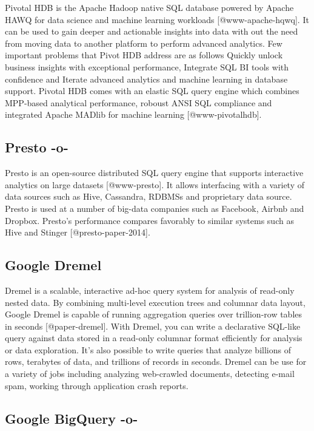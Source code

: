 Pivotal HDB is the Apache Hadoop native SQL database powered by Apache
HAWQ for data science and machine learning workloads
[@www-apache-hqwq]. It can be used to gain deeper and actionable
insights into data with out the need from moving data to another
platform to perform advanced analytics. Few important problems that
Pivot HDB address are as follows Quickly unlock business insights with
exceptional performance, Integrate SQL BI tools with confidence and
Iterate advanced analytics and machine learning in database
support. Pivotal HDB comes with an elastic SQL query engine which
combines MPP-based analytical performance, roboust ANSI SQL compliance
and integrated Apache MADlib for machine learning
[@www-pivotalhdb].


     
\subsection{Presto -o-}

Presto is an open-source distributed SQL query engine that supports
interactive analytics on large datasets [@www-presto]. It allows
interfacing with a variety of data sources such as Hive, Cassandra,
RDBMSs and proprietary data source. Presto is used at a number of
big-data companies such as Facebook, Airbnb and Dropbox. Presto's
performance compares favorably to similar systems such as Hive and
Stinger [@presto-paper-2014].



\subsection{Google Dremel}
 
Dremel is a scalable, interactive ad-hoc query system for analysis of
read-only nested data. By combining multi-level execution trees and
columnar data layout, Google Dremel is capable of running aggregation
queries over trillion-row tables in seconds [@paper-dremel]. With
Dremel, you can write a declarative SQL-like query against data stored
in a read-only columnar format efficiently for analysis or data
exploration.  It's also possible to write queries that analyze
billions of rows, terabytes of data, and trillions of records in
seconds. Dremel can be use for a variety of jobs including analyzing
web-crawled documents, detecting e-mail spam, working through
application crash reports.

\subsection{Google BigQuery -o-}


